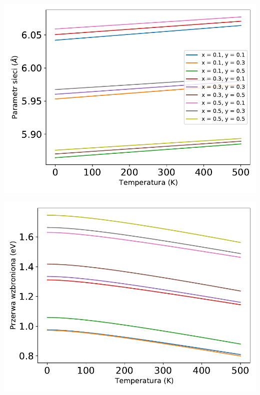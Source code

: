 \documentclass[12pt,openany,a4paper]{book}
\begin{document}
\begin{minipage}[t]{0.5\textwidth}
	\includegraphics[width = 0.9\linewidth]{Figures/strain/alc1.pdf}\label{fig:alc1}
\end{minipage}
\begin{minipage}[t]{0.5\textwidth}
	\includegraphics[width = 0.9\linewidth]{Figures/strain/eg1.pdf}\label{fig:eg1}
\end{minipage}
\end{document}
